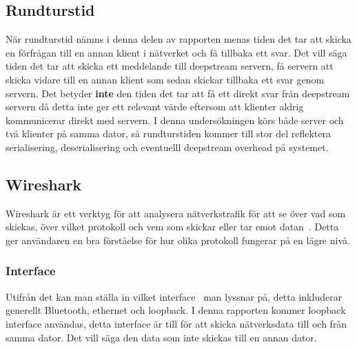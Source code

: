 \subsection{Rundturstid}
När rundturstid nämns i denna delen av rapporten menas tiden det tar att skicka en förfrågan till en annan klient i nätverket och få tillbaka ett svar. Det vill säga tiden det tar att skicka ett meddelande till deepstream servern, få servern att skicka vidare till en annan klient som sedan skickar tillbaka ett svar genom servern. Det betyder \textbf{inte} den tiden det tar att få ett direkt svar från deepstream servern då detta inte ger ett relevant värde eftersom att klienter aldrig kommunicerar direkt med servern. I denna undersökningen körs både server och två klienter på samma dator, så rundturstiden kommer till stor del reflektera serialisering, deserialisering och eventuelll deepstream overhead på systemet.

\subsection{Wireshark}
Wireshark är ett verktyg för att analysera nätverkstrafik för att se över vad som skickas, över vilket protokoll och vem som skickar eller tar emot datan~\cite{wireshark:main}. Detta ger användaren en bra förståelse för hur olika protokoll fungerar på en lägre nivå.

\subsubsection{Interface}
Utifrån det kan man ställa in vilket interface~\cite[p.~364]{networking} man lyssnar på, detta inkluderar generellt Bluetooth, ethernet och loopback. I denna rapporten kommer loopback interface användas, detta interface är till för att skicka nätverksdata till och från samma dator. Det vill säga den data som inte skickas till en annan dator.
